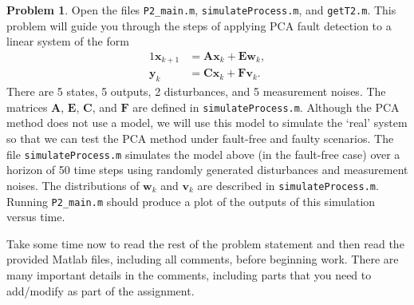 \documentclass[14pt]{article}
\theoremstyle{definition}
\newtheorem{problem}{Problem}
\newcommand{\0}{\ensuremath{\mathbf{0}}}
\newcommand{\bs}[1]{\ensuremath{\mathbf{#1}}}
\begin{document}
\begin{problem}
Open the files \verb+P2_main.m+, \verb+simulateProcess.m+, and \verb+getT2.m+. This problem will guide you through the steps of applying PCA fault detection to a linear system of the form
\begin{alignat}{1}
\bs{x}_{k+1} &= \bs{Ax}_k + \bs{Ew}_k, \\
\bs{y}_{k} &= \bs{Cx}_k + \bs{Fv}_k.
\end{alignat}
There are 5 states, 5 outputs, 2 disturbances, and 5 measurement noises. The matrices $\bs{A}$, $\bs{E}$, $\bs{C}$, and $\bs{F}$ are defined in \verb+simulateProcess.m+. Although the PCA method does not use a model, we will use this model to simulate the `real' system so that we can test the PCA method under fault-free and faulty scenarios. The file \verb+simulateProcess.m+ simulates the model above (in the fault-free case) over a horizon of 50 time steps using randomly generated disturbances and measurement noises. The distributions of $\bs{w}_k$ and $\bs{v}_k$ are described in \verb+simulateProcess.m+. Running \verb+P2_main.m+ should produce a plot of the outputs of this simulation versus time.

Take some time now to read the rest of the problem statement and then read the provided Matlab files, including all comments, before beginning work. There are many important details in the comments, including parts that you need to add/modify as part of the assignment.


\end{problem}
\end{document}
